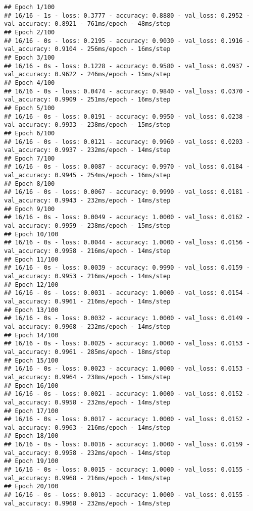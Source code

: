 \documentclass[
]{article}
\begin{document}
\begin{verbatim}
## Epoch 1/100
## 16/16 - 1s - loss: 0.3777 - accuracy: 0.8880 - val_loss: 0.2952 - val_accuracy: 0.8921 - 761ms/epoch - 48ms/step
## Epoch 2/100
## 16/16 - 0s - loss: 0.2195 - accuracy: 0.9030 - val_loss: 0.1916 - val_accuracy: 0.9104 - 256ms/epoch - 16ms/step
## Epoch 3/100
## 16/16 - 0s - loss: 0.1228 - accuracy: 0.9580 - val_loss: 0.0937 - val_accuracy: 0.9622 - 246ms/epoch - 15ms/step
## Epoch 4/100
## 16/16 - 0s - loss: 0.0474 - accuracy: 0.9840 - val_loss: 0.0370 - val_accuracy: 0.9909 - 251ms/epoch - 16ms/step
## Epoch 5/100
## 16/16 - 0s - loss: 0.0191 - accuracy: 0.9950 - val_loss: 0.0238 - val_accuracy: 0.9933 - 238ms/epoch - 15ms/step
## Epoch 6/100
## 16/16 - 0s - loss: 0.0121 - accuracy: 0.9960 - val_loss: 0.0203 - val_accuracy: 0.9937 - 232ms/epoch - 14ms/step
## Epoch 7/100
## 16/16 - 0s - loss: 0.0087 - accuracy: 0.9970 - val_loss: 0.0184 - val_accuracy: 0.9945 - 254ms/epoch - 16ms/step
## Epoch 8/100
## 16/16 - 0s - loss: 0.0067 - accuracy: 0.9990 - val_loss: 0.0181 - val_accuracy: 0.9943 - 232ms/epoch - 14ms/step
## Epoch 9/100
## 16/16 - 0s - loss: 0.0049 - accuracy: 1.0000 - val_loss: 0.0162 - val_accuracy: 0.9959 - 238ms/epoch - 15ms/step
## Epoch 10/100
## 16/16 - 0s - loss: 0.0044 - accuracy: 1.0000 - val_loss: 0.0156 - val_accuracy: 0.9958 - 216ms/epoch - 14ms/step
## Epoch 11/100
## 16/16 - 0s - loss: 0.0039 - accuracy: 0.9990 - val_loss: 0.0159 - val_accuracy: 0.9953 - 216ms/epoch - 14ms/step
## Epoch 12/100
## 16/16 - 0s - loss: 0.0031 - accuracy: 1.0000 - val_loss: 0.0154 - val_accuracy: 0.9961 - 216ms/epoch - 14ms/step
## Epoch 13/100
## 16/16 - 0s - loss: 0.0032 - accuracy: 1.0000 - val_loss: 0.0149 - val_accuracy: 0.9968 - 232ms/epoch - 14ms/step
## Epoch 14/100
## 16/16 - 0s - loss: 0.0025 - accuracy: 1.0000 - val_loss: 0.0153 - val_accuracy: 0.9961 - 285ms/epoch - 18ms/step
## Epoch 15/100
## 16/16 - 0s - loss: 0.0023 - accuracy: 1.0000 - val_loss: 0.0153 - val_accuracy: 0.9964 - 238ms/epoch - 15ms/step
## Epoch 16/100
## 16/16 - 0s - loss: 0.0021 - accuracy: 1.0000 - val_loss: 0.0152 - val_accuracy: 0.9958 - 232ms/epoch - 14ms/step
## Epoch 17/100
## 16/16 - 0s - loss: 0.0017 - accuracy: 1.0000 - val_loss: 0.0152 - val_accuracy: 0.9963 - 216ms/epoch - 14ms/step
## Epoch 18/100
## 16/16 - 0s - loss: 0.0016 - accuracy: 1.0000 - val_loss: 0.0159 - val_accuracy: 0.9958 - 232ms/epoch - 14ms/step
## Epoch 19/100
## 16/16 - 0s - loss: 0.0015 - accuracy: 1.0000 - val_loss: 0.0155 - val_accuracy: 0.9968 - 216ms/epoch - 14ms/step
## Epoch 20/100
## 16/16 - 0s - loss: 0.0013 - accuracy: 1.0000 - val_loss: 0.0155 - val_accuracy: 0.9968 - 232ms/epoch - 14ms/step

\end{verbatim}
\end{document}
